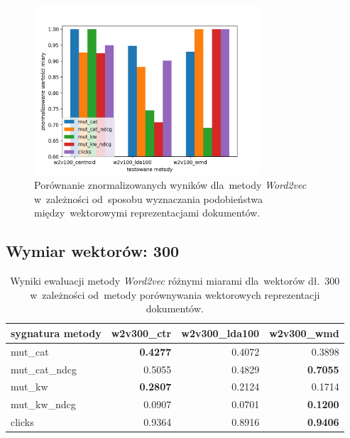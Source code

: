 \documentclass[pl]{minipw} %
\begin{document}
\begin{figure}[H]
	\centering
	\includegraphics[width=0.75\textwidth]{img/results/w2v100_centroid_w2v100_lda100_w2v100_wmd_.png}
	\caption{Porównanie znormalizowanych wyników dla~metody \textit{Word2vec} w~zależności od~sposobu wyznaczania podobieństwa między~wektorowymi reprezentacjami dokumentów.}
\end{figure}

\subsection{Wymiar wektorów: 300}


\begin{table}[H]
	\centering
	\begin{tabular}{lrrr}
		\hline
		sygnatura metody &   w2v300\_ctr &   w2v300\_lda100 &   w2v300\_wmd \\
	\hline
	mut\_cat      &            \textbf{0.4277} &          0.4072 &       0.3898 \\
	mut\_cat\_ndcg &            0.5055 &          0.4829 &       \textbf{0.7055} \\
	mut\_kw       &            \textbf{0.2807} &          0.2124 &       0.1714 \\
	mut\_kw\_ndcg  &            0.0907 &          0.0701 &       \textbf{0.1200}   \\
	clicks       &            0.9364 &          0.8916 &       \textbf{0.9406} \\
	\hline
	\end{tabular}
	\caption{Wyniki ewaluacji metody \textit{Word2vec} różnymi miarami dla~wektorów dł.~300 w~zależności od~metody porównywania wektorowych reprezentacji dokumentów.}
\end{table}
\end{document}
